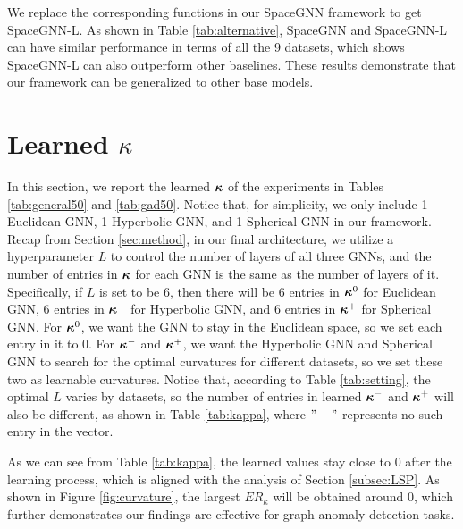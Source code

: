 We replace the corresponding functions in our SpaceGNN framework to get SpaceGNN-L. As shown in Table \ref{tab:alternative}, SpaceGNN and SpaceGNN-L can have similar performance in terms of all the 9 datasets, which shows SpaceGNN-L can also outperform other baselines. These results demonstrate that our framework can be generalized to other base models. 

\section{Learned $\kappa$}
\label{subsec:learnedk}


{\update In this section, we report the learned $\boldsymbol{\kappa}$ of the experiments in Tables \ref{tab:general50} and \ref{tab:gad50}. Notice that, for simplicity, we only include 1 Euclidean GNN, 1 Hyperbolic GNN, and 1 Spherical GNN in our framework. Recap from Section \ref{sec:method}, in our final architecture, we utilize a hyperparameter $L$ to control the number of layers of all three GNNs, and the number of entries in $\boldsymbol{\kappa}$ for each GNN is the same as the number of layers of it. Specifically, if $L$ is set to be 6, then there will be 6 entries in $\boldsymbol{\kappa}^0$ for Euclidean GNN, 6 entries in $\boldsymbol{\kappa}^-$ for Hyperbolic GNN, and 6 entries in $\boldsymbol{\kappa}^+$ for Spherical GNN. For $\boldsymbol{\kappa}^0$, we want the GNN to stay in the Euclidean space, so we set each entry in it to 0. For $\boldsymbol{\kappa}^-$ and $\boldsymbol{\kappa}^+$, we want the Hyperbolic GNN and Spherical GNN to search for the optimal curvatures for different datasets, so we set these two as learnable curvatures. Notice that, according to Table \ref{tab:setting}, the optimal $L$ varies by datasets, so the number of entries in learned $\boldsymbol{\kappa}^-$ and $\boldsymbol{\kappa}^+$ will also be different, as shown in Table \ref{tab:kappa}, where $"-"$ represents no such entry in the vector. 

As we can see from Table \ref{tab:kappa}, the learned values stay close to 0 after the learning process, which is aligned with the analysis of Section \ref{subsec:LSP}. As shown in Figure \ref{fig:curvature}, the largest $ER_\kappa$ will be obtained around 0, which further demonstrates our findings are effective for graph anomaly detection tasks. 
}


